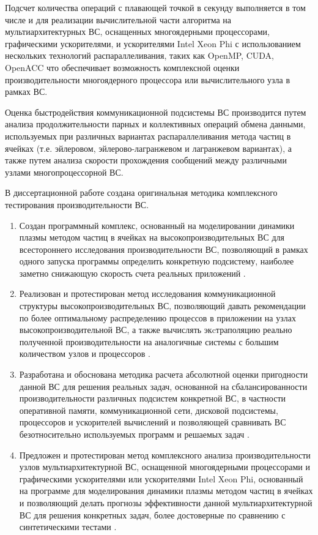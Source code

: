 Подсчет количества операций с плавающей точкой в секунду выполняется в том числе и  для реализации вычислительной части алгоритма на мультиархитектурных ВС, оснащенных многоядерными процессорами, графическими ускорителями, и ускорителями Intel Xeon Phi с использованием нескольких технологий распараллеливания, таких как OpenMP, CUDA, OpenACC что обеспечивает возможность комплексной оценки производительности многоядерного  процессора или вычислительного узла в рамках ВС.

Оценка быстродействия коммуникационной подсистемы ВС производится путем анализа продолжительности парных и коллективных операций обмена данными, используемых при различных вариантах распараллеливания метода частиц в ячейках (т.е. эйлеровом, эйлерово-лагранжевом и лагранжевом вариантах), а также путем анализа скорости прохождения сообщений между различными узлами многопроцессорной ВС.    

В диссертационной работе создана оригинальная методика комплексного тестирования производительности ВС.
 
{}
\begin{enumerate}
\item Создан программный комплекс, основанный на моделировании динамики плазмы методом частиц в ячейках на высокопроизводительных ВС для всестороннего исследования производительности ВС, позволяющий в рамках одного запуска программы определить конкретную подсистему, наиболее заметно снижающую скорость счета реальных приложений \cite{LotovPoP,MatMod,VychMetPlasma,VestnikNNSU,adaptCPC}. 

\item Реализован и протестирован метод исследования коммуникационной структуры высокопроизводительных ВС, позволяющий давать рекомендации по более оптимальному распределению процессов в приложении на узлах высокопроизводительной ВС, а также вычислять экcтраполяцию реально полученной производительности на аналогичные системы с большим количеством узлов и процессоров \cite{VestnikNSUadapt,VestnikNNSU}.

\item Разработана и обоснована методика расчета абсолютной оценки пригодности данной ВС для решения реальных задач, основанной на сбалансированности производительности различных подсистем конкретной ВС, в частности оперативной памяти, коммуникационной сети, дисковой подсистемы, процессоров и ускорителей вычислений и позволяющей сравнивать ВС безотносительно используемых программ и решаемых задач \cite{multigridAuto,VestnikNNSU,SuperFrI,astroCoDesign,integrApproach,NumMethMultiLevel}. 

\item Предложен и протестирован метод комплексного анализа производительности узлов мультиархитектурной ВС, оснащенной многоядерными процессорами и графическими ускорителями или ускорителями Intel Xeon Phi, основанный на программе для моделирования динамики плазмы методом частиц в ячейках и позволяющий делать прогнозы эффективности данной мультиархитектурной ВС для решения конкретных задач, более достоверные по сравнению с синтетическими тестами  \cite{MohographyTarkov,VestnikNSU3D,MatMod,VychMethProgExa}.
\end{enumerate}

